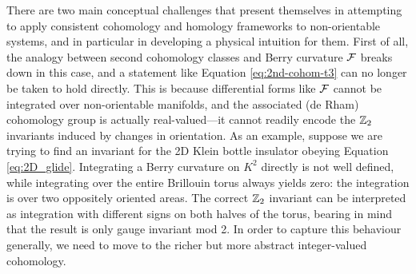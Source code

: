 There are two main conceptual challenges that present themselves in attempting to apply consistent cohomology and homology frameworks to non-orientable systems, and in particular in developing a physical intuition for them. First of all, the analogy between second cohomology classes and Berry curvature $\mathcal{F}$ breaks down in this case, and a statement like Equation \eqref{eq:2nd-cohom-t3} can no longer be taken to hold directly. %
This is because differential forms like $\mathcal{F}$ cannot be integrated over non-orientable manifolds, and the associated (de Rham) cohomology group is actually real-valued---it cannot readily encode the $\mathbb{Z}_2$ invariants induced by changes in orientation. As an example, suppose we are trying to find an invariant for the 2D Klein bottle insulator obeying Equation \eqref{eq:2D_glide}. Integrating a Berry curvature on $K^2$ directly is not well defined, while integrating over the entire Brillouin torus always yields zero: the integration is over two oppositely oriented areas. The correct $\mathbb{Z}_2$ invariant can be interpreted as integration with different signs on both halves of the torus, bearing in mind that the result is only gauge invariant mod 2. In order to capture this behaviour generally, we need to move to the richer but more abstract integer-valued cohomology. %

